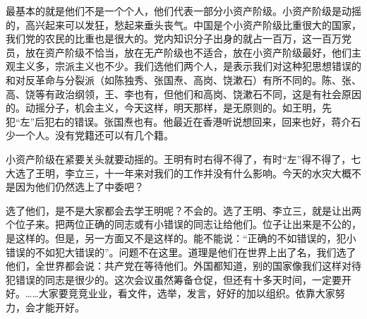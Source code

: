 最基本的就是他们不是一个个人，他们代表一部分小资产阶级。小资产阶级是动摇的，高兴起来可以发狂，愁起来垂头丧气。中国是个小资产阶级比重很大的国家，我们党的农民的比重也是很大的。党内知识分子出身的就占一百万，这一百万党员，放在资产阶级不恰当，放在无产阶级也不适合，放在小资产阶级最好，他们主观主义多，宗派主义也不少。我们选他们两个人，是表示我们对这种犯思想错误的和对反革命与分裂派（如陈独秀、张国焘、高岗、饶漱石）有所不同的。陈、张、高、饶等有政治纲领，王、李也有，但他们和高岗、饶漱石不同，这是有社会原因的。动摇分子，机会主义，今天这样，明天那样，是无原则的。如王明，先犯“左”后犯右的错误。张国焘也有。他最近在香港听说想回来，回来也好，蒋介石少一个人。没有党籍还可以有几个籍。

小资产阶级在紧要关头就要动摇的。王明有时右得不得了，有时“左”得不得了，七大选了王明，李立三，十一年来对我们的工作并没有什么影响。今天的水灾大概不是因为他们仍然选上了中委吧？

选了他们，是不是大家都会去学王明呢？不会的。选了王明、李立三，就是让出两个位子来。把两位正确的同志或有小错误的同志让给他们。位子让出来是不公的，是这样的。但是，另一方面又不是这样的。能不能说：“正确的不如错误的，犯小错误的不如犯大错误的”。问题不在这里。道理是他们在世界上出了名，我们选了他们，全世界都会说：共产党在等待他们。外国都知道，别的国家像我们这样对待犯错误的同志是很少的。这次会议虽然筹备仓促，但还有十多天时间，一定要开好。……大家要竞竞业业，看文件，选举，发言，好好的加以组织。依靠大家努力，会才能开好。


